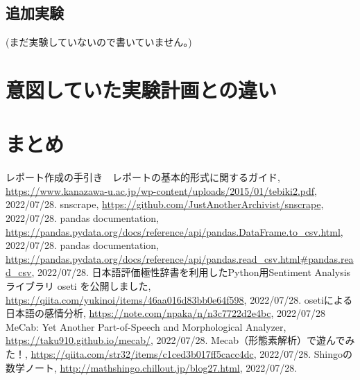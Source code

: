 \documentclass[a4paper, 11pt, titlepage]{jsarticle}
\begin{document}
\subsection{追加実験}
(まだ実験していないので書いていません。)

\section{意図していた実験計画との違い}


\section{まとめ}


\begin{thebibliography}{n}
  レポート作成の手引き　レポートの基本的形式に関するガイド, \url{https://www.kanazawa-u.ac.jp/wp-content/uploads/2015/01/tebiki2.pdf}, 2022/07/28.
      snscrape, \url{https://github.com/JustAnotherArchivist/snscrape}, 2022/07/28.
      pandas documentation, \url{https://pandas.pydata.org/docs/reference/api/pandas.DataFrame.to_csv.html}, 2022/07/28.
      pandas documentation, \url{https://pandas.pydata.org/docs/reference/api/pandas.read_csv.html#pandas.read_csv}, 2022/07/28.
      日本語評価極性辞書を利用したPython用Sentiment Analysisライブラリ oseti を公開しました, \url{https://qiita.com/yukinoi/items/46aa016d83bb0e64f598}, 2022/07/28.
      osetiによる日本語の感情分析, \url{https://note.com/npaka/n/n3c7722d2e4bc}, 2022/07/28
      MeCab: Yet Another Part-of-Speech and Morphological Analyzer, \url{https://taku910.github.io/mecab/}, 2022/07/28.
      Mecab（形態素解析）で遊んでみた！, \url{https://qiita.com/str32/items/c1ced3b017ff5cacc4dc}, 2022/07/28.
      Shingoの数学ノート, \url{http://mathshingo.chillout.jp/blog27.html}, 2022/07/28.

\end{thebibliography}
\end{document}
